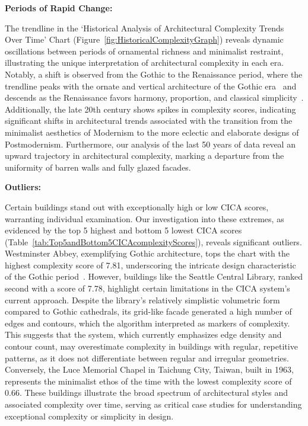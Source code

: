 \textbf{Periods of Rapid Change:}

The trendline in the `Historical Analysis of Architectural Complexity Trends Over Time' Chart (Figure~\ref{fig:HistoricalComplexityGraph}) reveals dynamic oscillations between periods of ornamental richness and minimalist restraint, illustrating the unique interpretation of architectural complexity in each era.
Notably, a shift is observed from the Gothic to the Renaissance period, where the trendline peaks with the ornate and vertical architecture of the Gothic era~\cite{Kennedy2013} and descends as the Renaissance favors harmony, proportion, and classical simplicity~\cite{Marder1990}.
Additionally, the late 20th century shows spikes in complexity scores, indicating significant shifts in architectural trends associated with the transition from the minimalist aesthetics of Modernism to the more eclectic and elaborate designs of Postmodernism.
Furthermore, our analysis of the last 50 years of data reveal an upward trajectory in architectural complexity, marking a departure from the uniformity of barren walls and fully glazed facades.

\textbf{Outliers:}

Certain buildings stand out with exceptionally high or low CICA scores, warranting individual examination.
Our investigation into these extremes, as evidenced by the top 5 highest and bottom 5 lowest CICA scores (Table~\ref{tab:Top5andBottom5CICAcomplexityScores}), reveals significant outliers.
Westminster Abbey, exemplifying Gothic architecture, tops the chart with the highest complexity score of 7.81, underscoring the intricate design characteristic of the Gothic period~\cite{Kennedy2013}.
However, buildings like the Seattle Central Library, ranked second with a score of 7.78, highlight certain limitations in the CICA system's current approach.
Despite the library's relatively simplistic volumetric form compared to Gothic cathedrals, its grid-like facade generated a high number of edges and contours, which the algorithm interpreted as markers of complexity.
This suggests that the system, which currently emphasizes edge density and contour count, may overestimate complexity in buildings with regular, repetitive patterns, as it does not differentiate between regular and irregular geometries.
Conversely, the Luce Memorial Chapel in Taichung City, Taiwan, built in 1963, represents the minimalist ethos of the time with the lowest complexity score of 0.66.
These buildings illustrate the broad spectrum of architectural styles and associated complexity over time, serving as critical case studies for understanding exceptional complexity or simplicity in design.



